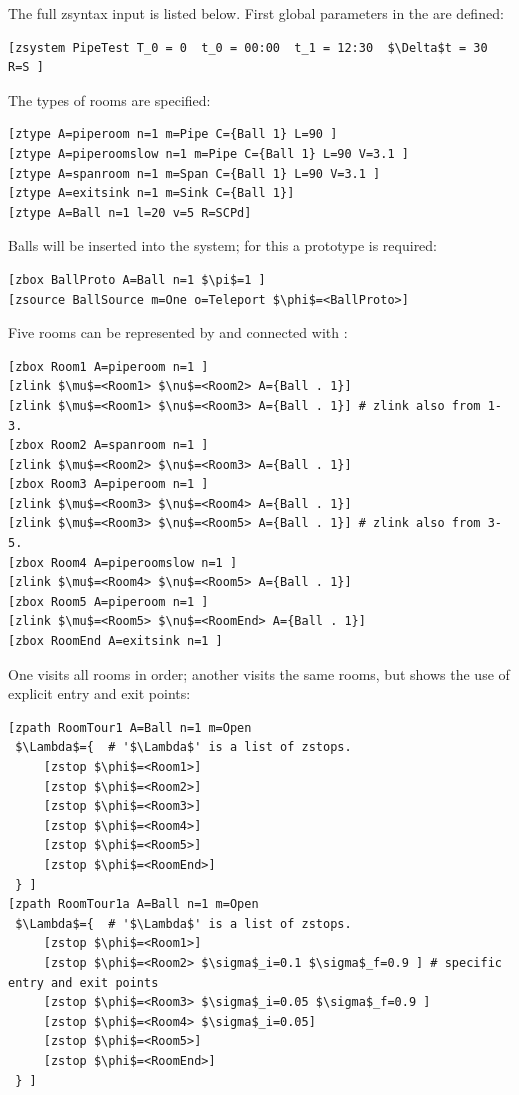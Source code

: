 The full zsyntax input is listed below. First global parameters in the  are defined:
\begin{lstlisting}[mathescape]
[zsystem PipeTest T_0 = 0  t_0 = 00:00  t_1 = 12:30  $\Delta$t = 30  R=S ]
\end{lstlisting}
The types of rooms are specified:
\begin{lstlisting}[mathescape]
[ztype A=piperoom n=1 m=Pipe C={Ball 1} L=90 ]
[ztype A=piperoomslow n=1 m=Pipe C={Ball 1} L=90 V=3.1 ]
[ztype A=spanroom n=1 m=Span C={Ball 1} L=90 V=3.1 ]
[ztype A=exitsink n=1 m=Sink C={Ball 1}]
[ztype A=Ball n=1 l=20 v=5 R=SCPd]
\end{lstlisting}
Balls will be inserted into the system; for this a prototype  is required:
\begin{lstlisting}[mathescape]
[zbox BallProto A=Ball n=1 $\pi$=1 ]
[zsource BallSource m=One o=Teleport $\phi$=<BallProto>]
\end{lstlisting}
Five rooms can be represented by  and connected with :
\begin{lstlisting}[mathescape]
[zbox Room1 A=piperoom n=1 ]
[zlink $\mu$=<Room1> $\nu$=<Room2> A={Ball . 1}]
[zlink $\mu$=<Room1> $\nu$=<Room3> A={Ball . 1}] # zlink also from 1-3.
[zbox Room2 A=spanroom n=1 ]
[zlink $\mu$=<Room2> $\nu$=<Room3> A={Ball . 1}]
[zbox Room3 A=piperoom n=1 ]
[zlink $\mu$=<Room3> $\nu$=<Room4> A={Ball . 1}]
[zlink $\mu$=<Room3> $\nu$=<Room5> A={Ball . 1}] # zlink also from 3-5.
[zbox Room4 A=piperoomslow n=1 ]
[zlink $\mu$=<Room4> $\nu$=<Room5> A={Ball . 1}]
[zbox Room5 A=piperoom n=1 ]
[zlink $\mu$=<Room5> $\nu$=<RoomEnd> A={Ball . 1}]
[zbox RoomEnd A=exitsink n=1 ]
\end{lstlisting}
One  visits all rooms in order; another visits the same rooms, but
shows the use of explicit entry and exit points:
\begin{lstlisting}[mathescape]
[zpath RoomTour1 A=Ball n=1 m=Open
 $\Lambda$={  # '$\Lambda$' is a list of zstops.
     [zstop $\phi$=<Room1>]
     [zstop $\phi$=<Room2>]
     [zstop $\phi$=<Room3>]
     [zstop $\phi$=<Room4>]
     [zstop $\phi$=<Room5>]
     [zstop $\phi$=<RoomEnd>]
 } ]
[zpath RoomTour1a A=Ball n=1 m=Open
 $\Lambda$={  # '$\Lambda$' is a list of zstops.
     [zstop $\phi$=<Room1>]
     [zstop $\phi$=<Room2> $\sigma$_i=0.1 $\sigma$_f=0.9 ] # specific entry and exit points
     [zstop $\phi$=<Room3> $\sigma$_i=0.05 $\sigma$_f=0.9 ]
     [zstop $\phi$=<Room4> $\sigma$_i=0.05] 
     [zstop $\phi$=<Room5>]
     [zstop $\phi$=<RoomEnd>]
 } ]
\end{lstlisting}
